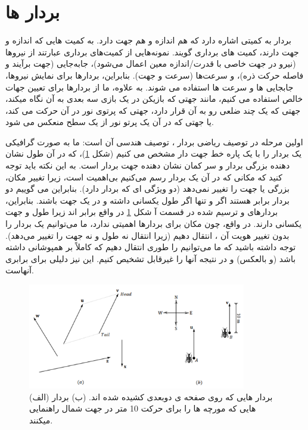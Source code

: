 \section{
    \huge
    \textbf{بردار ها}
}
{
    \Large
    \begin{spacing}{1.4}
        بردار به کمیتی اشاره دارد که هم اندازه و هم جهت دارد.
        به کمیت هایی که اندازه و جهت دارند، کمیت های برداری گویند.
        نمونه‌هایی از کمیت‌های برداری عبارتند از نیروها (نیرو در جهت خاصی با قدرت/اندازه معین اعمال می‌شود)، جابه‌جایی (جهت برآیند و فاصله حرکت ذره)، و سرعت‌ها (سرعت و جهت).
        بنابراین، بردارها برای نمایش نیروها، جابجایی ها و سرعت ها استفاده می شوند.
        به علاوه، ما از بردارها برای تعیین جهات خالص استفاده می کنیم،
        مانند جهتی که بازیکن در یک بازی سه بعدی به آن نگاه میکند،
        جهتی که یک چند ضلعی رو به آن قرار دارد، جهتی که پرتوی نور در آن حرکت می کند،
        یا جهتی که در آن یک پرتو نور از یک سطح منعکس می شود.

        اولین مرحله در توصیف ریاضی بردار ، توصیف هندسی آن است: ما به صورت گرافیکی یک بردار را با یک پاره خط جهت دار مشخص می کنیم (شکل \ref{fig:4.Session.1.1.1})، که در آن طول نشان دهنده بزرگی بردار و سر کمان نشان دهنده جهت بردار است.
        به این نکته باید توجه کنید که مکانی که در آن یک بردار رسم می‌کنیم بی‌اهمیت است، زیرا تغییر مکان، بزرگی یا جهت را تغییر نمی‌دهد (دو ویژگی ای که بردار دارد).
        بنابراین می گوییم دو بردار برابر هستند اگر و تنها اگر طول یکسانی داشته و در یک جهت باشند.
        بنابراین، بردارهای  و  ترسیم شده در قسمت آ شکل \ref{fig:4.Session.1.1.1} در واقع برابر اند زیرا طول و جهت یکسانی دارند.
        در واقع، چون مکان برای بردارها اهمیتی ندارد، ما می‌توانیم یک بردار را بدون تغییر هویت آن ، انتقال دهیم (زیرا انتقال نه طول و نه جهت را تغییر می‌دهد).
        توجه داشته باشید که ما می‌توانیم  را طوری انتقال دهیم که کاملاً بر  همپوشانی داشته باشد (و بالعکس) و در نتیجه آنها را غیرقابل تشخیص کنیم. این نیز دلیلی برای برابری آنهاست.

        \begin{figure}[H]
            \centering
            \setlength{\belowcaptionskip}{-10pt}
            \includegraphics[width=0.85\textwidth]{Images/4/4.Session.1.1.1}
            \caption{(الف) بردار هایی که روی صفحه ی دوبعدی کشیده شده اند.
                (ب) بردار هایی که مورچه ها را برای حرکت 10 متر در جهت شمال راهنمایی میکنند.}
            \label{fig:4.Session.1.1.1}
        \end{figure}


\end{spacing}}
